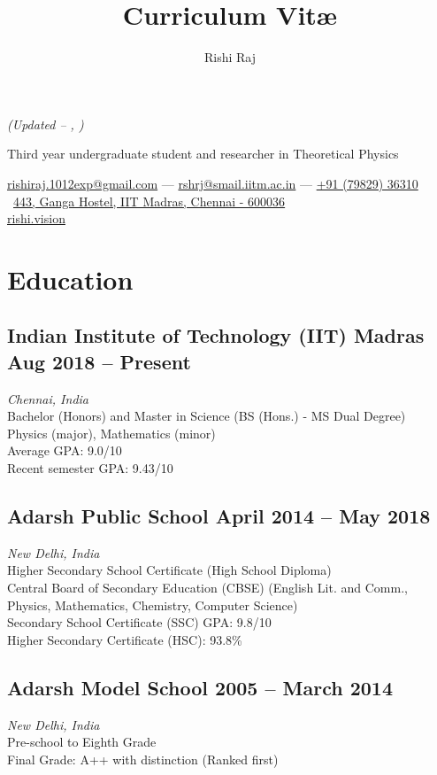 \documentclass[11pt, a4paper]{article}
\makeatletter
\newcommand{\monthyeardate}{%
  \DTMenglishmonthname{\@dtm@month}, \@dtm@year
}
\newcommand{\Mail}[1]{\href{mailto:#1}{#1}}
\newcommand{\Website}[1]{\href{https://#1}{#1}}
\renewcommand{\maketitle}{
{\Huge\mdseries\theauthor}\hfill{\color{Gray}\small\itshape \thetitle \hspace{0.1em} (Updated -- \monthyeardate)\vspace{0.2cm}}

Third year undergraduate student and researcher in Theoretical Physics \vspace{0.3cm}

\hspace{0.1cm}\parbox{1\linewidth}{
    {\small\color[HTML]{333333}
        {\faSend} \hspace{0.2cm} \Mail{rishiraj.1012exp@gmail.com} \hspace{0.5em} --- \hspace{0.5em} \Mail{rshrj@smail.iitm.ac.in} \hspace{0.5em} --- \hspace{0.5em} \href{tel:+917982936310}{+91 (79829) 36310} \\
        \, \faMapMarker \hspace{0.3cm} \href{https://goo.gl/maps/Y1KDvzKp8cHYy8iY8}{443, Ganga Hostel, IIT Madras, Chennai - 600036} \\
        \faGlobe \hspace{0.2cm} \Website{rishi.vision}
    }
}\vspace{0.3cm}

}
\makeatother
\begin{document}
\title{Curriculum Vit\ae}
\author{Rishi Raj}

\maketitle

\thispagestyle{empty}

\section{Education}

\subsection{Indian Institute of Technology (IIT) Madras \hfill \large{Aug 2018 -- Present}}
\hspace{0.02\linewidth}
\parbox{0.88\linewidth}{
    \textit{Chennai, India} \\
    {\small Bachelor (Honors) and Master in Science (BS (Hons.) - MS Dual Degree) \\
    Physics (major), Mathematics (minor) \\
    Average GPA: 9.0/10 \\
    Recent semester GPA: 9.43/10}
}

\subsection{Adarsh Public School \hfill \large{April 2014 -- May 2018}}
\hspace{0.02\linewidth}
\parbox{0.88\linewidth}{
    \textit{New Delhi, India} \\
    {\small Higher Secondary School Certificate (High School Diploma) \\
    Central Board of Secondary Education (CBSE) (English Lit. and Comm., Physics, Mathematics, Chemistry, Computer Science) \\
    Secondary School Certificate (SSC) GPA: 9.8/10 \\
    Higher Secondary Certificate (HSC): 93.8\%}
}

\subsection{Adarsh Model School \hfill \large{2005 -- March 2014}}
\hspace{0.02\linewidth}
\parbox{0.88\linewidth}{
    \textit{New Delhi, India} \\
    {\small Pre-school to Eighth Grade \\
    Final Grade: A++ with distinction (Ranked first)}
}
\end{document}
